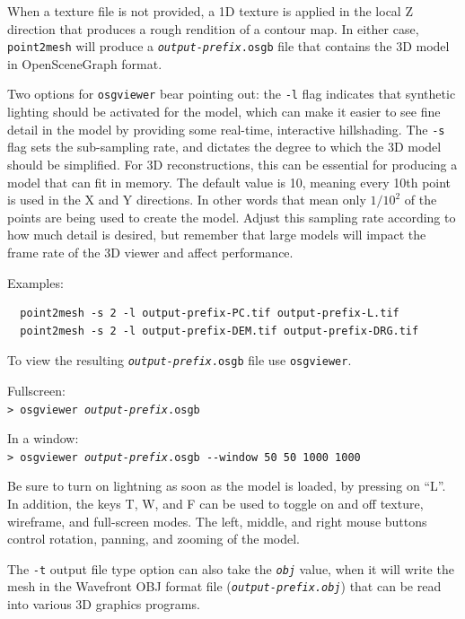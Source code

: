 When a texture file is not provided, a 1D texture is applied in the local Z direction
that produces a rough rendition of a contour map.  In either case,
\texttt{point2mesh} will produce a \texttt{\textit{output-prefix}.osgb}
file that contains the 3D model in OpenSceneGraph format.

Two options for \texttt{osgviewer} bear pointing out: the \texttt{-l}
flag indicates that synthetic lighting should be activated for the
model, which can make it easier to see fine detail in the model by
providing some real-time, interactive hillshading.  The \verb#-s#
flag sets the sub-sampling rate, and dictates the degree to which
the 3D model should be simplified.  For 3D reconstructions, this
can be essential for producing a model that can fit in memory.  The
default value is 10, meaning every 10th point is used in the X and
Y directions. In other words that mean only $1/10^2$ of the points
are being used to create the model. Adjust this sampling rate
according to how much detail is desired, but remember that large
models will impact the frame rate of the 3D viewer and affect
performance.

Examples:
\begin{verbatim}
  point2mesh -s 2 -l output-prefix-PC.tif output-prefix-L.tif
  point2mesh -s 2 -l output-prefix-DEM.tif output-prefix-DRG.tif
\end{verbatim}

To view the resulting \texttt{\textit{output-prefix}.osgb} file use
\texttt{osgviewer}.

\hspace*{2em}Fullscreen:\\
\hspace*{2em}\texttt{> osgviewer \textit{output-prefix}.osgb}

\hspace*{2em}In a window:\\
\hspace*{2em}\texttt{> osgviewer \textit{output-prefix}.osgb -\/-window 50 50 1000 1000}

Be sure to turn on lightning as soon as the model is loaded, by pressing on ``L''.
In addition, the keys T, W, and F can be used to toggle on
and off texture, wireframe, and full-screen modes.  The left, middle, and
right mouse buttons control rotation, panning, and zooming of the
model.

The \texttt{-t} output file type option can also take the
\texttt{\textit{obj}} value, when it will write the mesh in the
Wavefront OBJ format file (\texttt{\textit{output-prefix.obj}}) that can
be read into various 3D graphics programs.

